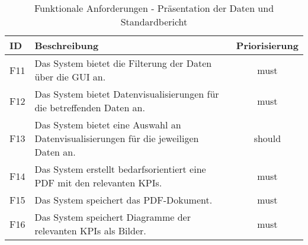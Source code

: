 \begingroup
\setlength{\tabcolsep}{10pt} %
\renewcommand{\arraystretch}{1.25} 
\begin{table}[h]
    \centering
    \begin{adjustbox}{max width=\textwidth}
    \begin{tabular}{lp{13cm}c}
       \toprule
       \textbf{ID}          & \textbf{Beschreibung} &\textbf{Priorisierung}\\
       \midrule
        F11                              &Das System bietet die Filterung der Daten über die GUI an.  & must\\
        F12                              &Das System bietet Datenvisualisierungen für die betreffenden Daten an. & must\\
        F13                              &Das System bietet eine Auswahl an Datenvisualisierungen für die jeweiligen Daten an. & should\\
        F14                              &Das System erstellt bedarfsorientiert eine PDF mit den relevanten KPIs. & must\\
        F15                              &Das System speichert das PDF-Dokument. & must\\
        F16                              &Das System speichert Diagramme der relevanten KPIs als Bilder. & must\\
        \bottomrule
    \end{tabular}
    \end{adjustbox}
    \caption{%
        Funktionale Anforderungen - Präsentation der Daten und Standardbericht
    }
    \label{tab:funktionale Anforderungen III}
    \end{table}
\endgroup






